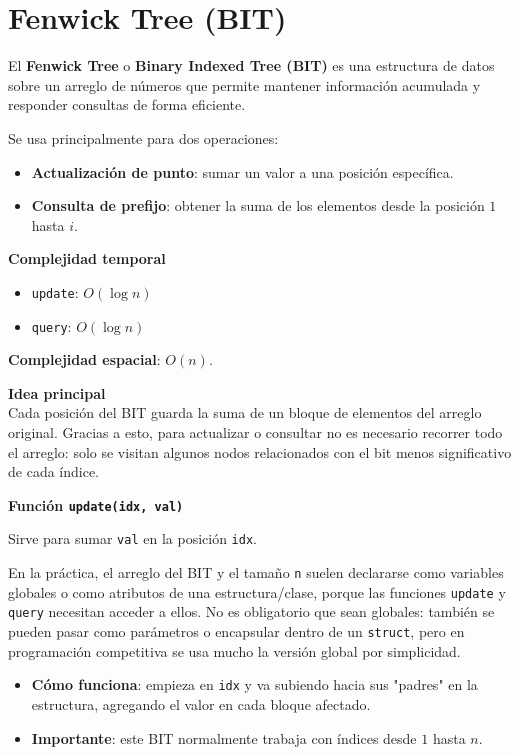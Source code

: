 \section{Fenwick Tree (BIT)}

El \textbf{Fenwick Tree} o \textbf{Binary Indexed Tree (BIT)} es una estructura de datos sobre un arreglo de números que permite mantener información acumulada y responder consultas de forma eficiente.

Se usa principalmente para dos operaciones:
\begin{itemize}
    \item \textbf{Actualización de punto}: sumar un valor a una posición específica.
    \item \textbf{Consulta de prefijo}: obtener la suma de los elementos desde la posición $1$ hasta $i$.
\end{itemize}

\textbf{Complejidad temporal}
\begin{itemize}
    \item \texttt{update}: $O(\log n)$
    \item \texttt{query}: $O(\log n)$
\end{itemize}

\textbf{Complejidad espacial}: $O(n)$.

\textbf{Idea principal} \\
Cada posición del BIT guarda la suma de un bloque de elementos del arreglo original. Gracias a esto, para actualizar o consultar no es necesario recorrer todo el arreglo: solo se visitan algunos nodos relacionados con el bit menos significativo de cada índice.

\textbf{Función \texttt{update(idx, val)}}

Sirve para sumar \texttt{val} en la posición \texttt{idx}.

En la práctica, el arreglo del BIT y el tamaño \texttt{n} suelen declararse como variables globales o como atributos de una estructura/clase, porque las funciones \texttt{update} y \texttt{query} necesitan acceder a ellos. No es obligatorio que sean globales: también se pueden pasar como parámetros o encapsular dentro de un \texttt{struct}, pero en programación competitiva se usa mucho la versión global por simplicidad.

\begin{itemize}
    \item \textbf{Cómo funciona}: empieza en \texttt{idx} y va subiendo hacia sus "padres" en la estructura, agregando el valor en cada bloque afectado.
    \item \textbf{Importante}: este BIT normalmente trabaja con índices desde $1$ hasta $n$.
\end{itemize}

